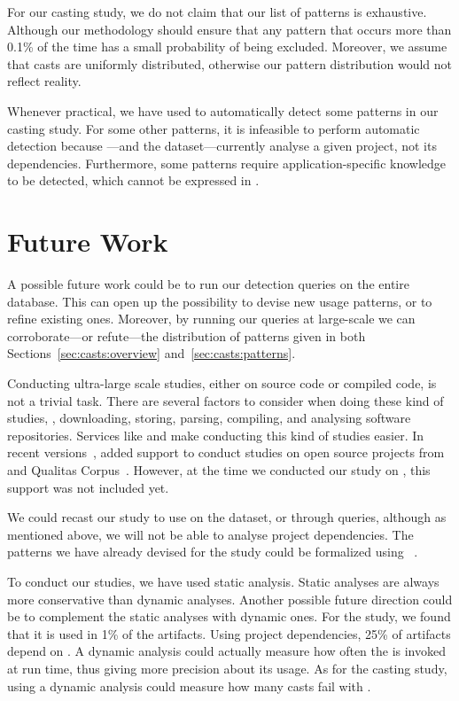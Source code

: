 For our casting study,
we do not claim that our list of patterns is exhaustive.
Although our methodology should ensure that any pattern that occurs more
than 0.1\% of the time has a small probability of being excluded.
Moreover, we assume that casts are uniformly distributed,
otherwise our pattern distribution would not reflect reality.

Whenever practical,
we have used \ql{} to automatically detect some patterns in our casting study.
For some other patterns, it is infeasible to perform automatic detection because \ql{}---and the \lgtm{} dataset---currently analyse a given project,
not its dependencies.
Furthermore, some patterns require application-specific knowledge to be detected,
which cannot be expressed in \ql{}.


\section{Future Work}

A possible future work could be to run our detection queries on the entire \lgtm{} database.
This can open up the possibility to devise new usage patterns,
or to refine existing ones.
Moreover,
by running our queries at large-scale we can corroborate---or refute---the distribution of patterns given in both Sections~\ref{sec:casts:overview} and~\ref{sec:casts:patterns}.

Conducting ultra-large scale studies, either on source code or compiled code, is not a trivial task.
There are several factors to consider when doing these kind of studies,
\eg{}, downloading, storing, parsing, compiling,
and analysing software repositories.
Services like \boa{} and \lgtm{} make conducting this kind of studies easier.
In recent versions~\citep{boa-github},
\boa{} added support to conduct studies on open source projects from \github{} and Qualitas Corpus~\citep{temperoQualitasCorpusCurated2010}.
However, at the time we conducted our study on \unsafe{},
this support was not included yet.

We could recast our \unsafe{} study to use \boa{} on the \github{} dataset,
or \lgtm{} through \ql{} queries, although as mentioned above,
we will not be able to analyse project dependencies.
The patterns we have already devised for the \unsafe{} study could be formalized using \ql{}~\citep{avgustinovQLObjectorientedQueries2016}.

To conduct our studies, we have used static analysis.
Static analyses are always more conservative than dynamic analyses.
Another possible future direction could be to complement the static analyses with dynamic ones.
For the \unsafe{} study,
we found that it is used in 1\% of the \mavencentral{} artifacts.
Using project dependencies, 25\% of artifacts depend on \smu{}.
A dynamic analysis could actually measure how often the \unsafe{} \api{} is invoked at run time,
thus giving more precision about its usage.
As for the casting study,
using a dynamic analysis could measure how many casts fail with .

